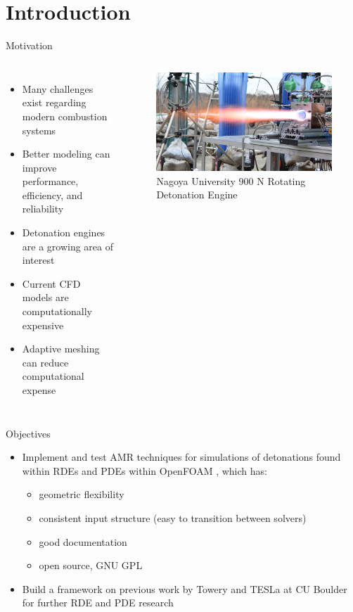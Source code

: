 \section{Introduction}
\begin{frame}{Motivation}
\begin{columns}
\begin{itemize}
\item Many challenges exist regarding modern combustion systems 
\item Better modeling can improve performance, efficiency, and reliability 
\item Detonation engines are a growing area of interest 
\item Current CFD models are computationally expensive
\item Adaptive meshing can reduce computational expense
\end{itemize}	

\begin{figure}
\centering
\includegraphics[width=\textwidth]{../figs/rde.jpg}
\caption{Nagoya University 900 N Rotating Detonation Engine \cite{nagoya}}
\end{figure}
\end{columns}
\end{frame}

\begin{frame}{Objectives}
\begin{itemize}
\item Implement and test AMR techniques for simulations of detonations found within RDEs and PDEs within OpenFOAM \cite{weller}, which has:
\begin{itemize}
\item geometric flexibility 
\item consistent input structure (easy to transition between solvers)
\item good documentation
\item open source, GNU GPL
\end{itemize}
\item Build a framework on previous work by Towery \cite{towery1} and TESLa at CU Boulder for further RDE and PDE research 
\end{itemize}
\end{frame}

